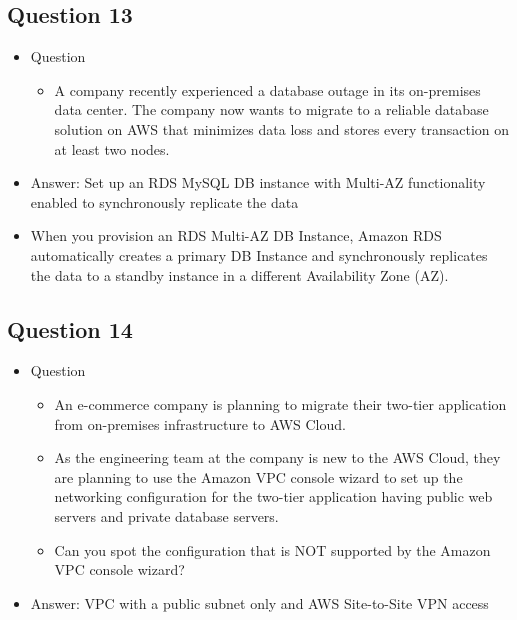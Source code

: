 \documentclass[]{scrartcl}
\begin{document}
\subsection{Question 13}
\begin{itemize}
	\item Question
	\begin{itemize}
		\item A company recently experienced a database outage in its on-premises data center. The company now wants to migrate to a reliable database solution on AWS that minimizes data loss and stores every transaction on at least two nodes.
	\end{itemize}
	\item Answer: Set up an RDS MySQL DB instance with Multi-AZ functionality enabled to synchronously replicate the data
	\item When you provision an RDS Multi-AZ DB Instance, Amazon RDS automatically creates a primary DB Instance and synchronously replicates the data to a standby instance in a different Availability Zone (AZ).
\end{itemize}

\subsection{Question 14}
\begin{itemize}
	\item Question
	\begin{itemize}
		\item An e-commerce company is planning to migrate their two-tier application from on-premises infrastructure to AWS Cloud. 
		\item As the engineering team at the company is new to the AWS Cloud, they are planning to use the Amazon VPC console wizard to set up the networking configuration for the two-tier application having public web servers and private database servers.
		\item Can you spot the configuration that is NOT supported by the Amazon VPC console wizard?
	\end{itemize}
	\item Answer: VPC with a public subnet only and AWS Site-to-Site VPN access
\end{itemize}
\end{document}
